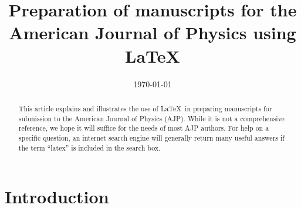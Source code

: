 \documentclass[prb,preprint]{revtex4-2}
\begin{document}

\title{Preparation of manuscripts for the American Journal of Physics
using \LaTeX}




\date{\today}

\begin{abstract}
This article explains and illustrates the use of \LaTeX\ in preparing manuscripts
for submission to the American Journal of Physics (AJP). While it is not a
comprehensive reference, we hope it will suffice for the needs of most
AJP authors.  For help on a specific question, an internet search engine will 
generally return many useful answers if the term ``latex'' is included in the 
search box.
\end{abstract}

\maketitle %


\section{Introduction} %
\end{document}
